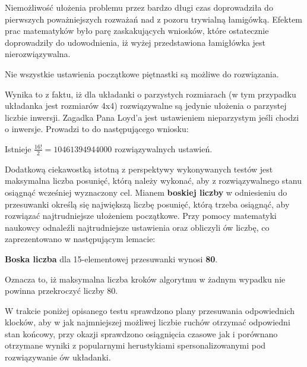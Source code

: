         Niemożliwość ułożenia problemu przez bardzo długi czas doprowadziła do pierwszych poważniejszych rozważań 
        nad z pozoru trywialną łamigówką. Efektem prac matematyków było parę zaskakujących wniosków, które ostatecznie doprowadziły 
        do udowodnienia, iż wyżej przedstawiona łamigłówka jest nierozwiązywalna.
        \begin{lemma}
            Nie wszystkie ustawienia początkowe piętnastki są możliwe do rozwiązania.\cite{Fifteen}
        \end{lemma}
        Wynika to z faktu, iż dla układanki o parzystych rozmiarach (w tym przypadku układanka jest rozmiarów 4x4)
        rozwiązywalne są jedynie ułożenia o parzystej liczbie inwersji. Zagadka Pana Loyd'a jest 
        ustawieniem nieparzystym jeśli chodzi o inwersje. Prowadzi to do następującego wniosku:
        \begin{corollary}
            Istnieje $\frac{16!}{2}=10 461 394 944 000$ rozwiązywalnych ustawień. 
        \end{corollary}
        Dodatkową ciekawostką istotną z perspektywy wykonywanych testów jest maksymalna liczba posunięć, którą należy wykonać, 
        aby z rozwiązywalnego stanu osiągnąć wcześniej wyznaczony cel. Mianem \textbf{boskiej liczby} w odniesieniu do przesuwanki
        określą się największą liczbę posunięć, którą trzeba osiągnąć, aby rozwiązać najtrudniejsze ułożeniem początkowe. Przy pomocy matematyki 
        naukowcy odnaleźli najtrudniejsze ustawienia oraz obliczyli ów liczbę, co zaprezentowano w następującym lemacie:
        \begin{lemma}
            \textbf{Boska liczba} dla 15-elementowej przesuwanki wynosi \textbf{80}. \cite{80Moves}
        \end{lemma}
        Oznacza to, iż maksymalna liczba kroków algorytmu w żadnym wypadku nie powinna przekroczyć liczby 80.

        W trakcie poniżej opisanego testu sprawdzono plany przesuwania odpowiednich klocków, aby w jak najmniejszej możliwej liczbie ruchów
        otrzymać odpowiedni stan końcowy, przy okazji sprawdzono osiągnięcia czasowe jak i porównano otrzymane wyniki z popularnymi herustykiami 
        spersonalizowanymi pod rozwiązywanie ów układanki.

